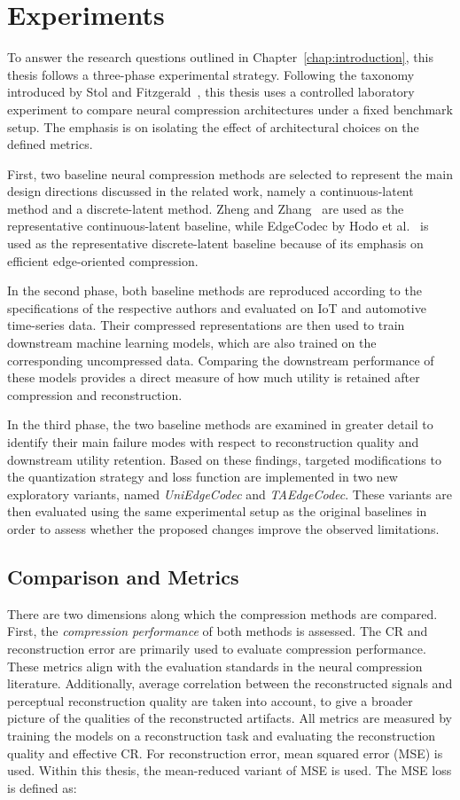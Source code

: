 \section{Experiments}

To answer the research questions outlined in Chapter~\ref{chap:introduction}, this thesis follows a three-phase experimental strategy. Following the taxonomy introduced by Stol and Fitzgerald~\cite{Stol2018}, this thesis uses a controlled laboratory experiment to compare neural compression architectures under a fixed benchmark setup. The emphasis is on isolating the effect of architectural choices on the defined metrics.

First, two baseline neural compression methods are selected to represent the main design directions discussed in the related work, namely a continuous-latent method and a discrete-latent method. Zheng and Zhang~\cite{Zheng2023} are used as the representative continuous-latent baseline, while EdgeCodec by Hodo et al.~\cite{Hodo2025} is used as the representative discrete-latent baseline because of its emphasis on efficient edge-oriented compression.

In the second phase, both baseline methods are reproduced according to the specifications of the respective authors and evaluated on IoT and automotive time-series data. Their compressed representations are then used to train downstream machine learning models, which are also trained on the corresponding uncompressed data. Comparing the downstream performance of these models provides a direct measure of how much utility is retained after compression and reconstruction.

In the third phase, the two baseline methods are examined in greater detail to identify their main failure modes with respect to reconstruction quality and downstream utility retention. Based on these findings, targeted modifications to the quantization strategy and loss function are implemented in two new exploratory variants, named \textit{UniEdgeCodec} and \textit{TAEdgeCodec}. These variants are then evaluated using the same experimental setup as the original baselines in order to assess whether the proposed changes improve the observed limitations.

\subsection{Comparison and Metrics} 

There are two dimensions along which the compression methods are compared. First, the \textit{compression performance} of both methods is assessed. The CR and reconstruction error are primarily used to evaluate compression performance. These metrics align with the evaluation standards in the neural compression literature. Additionally, average correlation between the reconstructed signals and perceptual reconstruction quality are taken into account, to give a broader picture of the qualities of the reconstructed artifacts. All metrics are measured by training the models on a reconstruction task and evaluating the reconstruction quality and effective CR. For reconstruction error, mean squared error (MSE) is used. Within this thesis, the mean-reduced variant of MSE is used. The MSE loss is defined as: 

